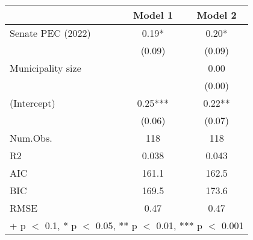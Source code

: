 \begin{table}
\centering
\begin{tabular}[t]{lcc}
\toprule
  & Model 1 & Model 2\\
\midrule
Senate PEC (2022) & \num{0.19}* & \num{0.20}*\\
 & (\num{0.09}) & (\num{0.09})\\
Municipality size &  & \num{0.00}\\
 &  & (\num{0.00})\\
(Intercept) & \num{0.25}*** & \num{0.22}**\\
 & (\num{0.06}) & (\num{0.07})\\
\midrule
Num.Obs. & \num{118} & \num{118}\\
R2 & \num{0.038} & \num{0.043}\\
AIC & \num{161.1} & \num{162.5}\\
BIC & \num{169.5} & \num{173.6}\\
RMSE & \num{0.47} & \num{0.47}\\
\bottomrule
\multicolumn{3}{l}{\rule{0pt}{1em}+ p $<$ 0.1, * p $<$ 0.05, ** p $<$ 0.01, *** p $<$ 0.001}\\
\end{tabular}
\end{table}
